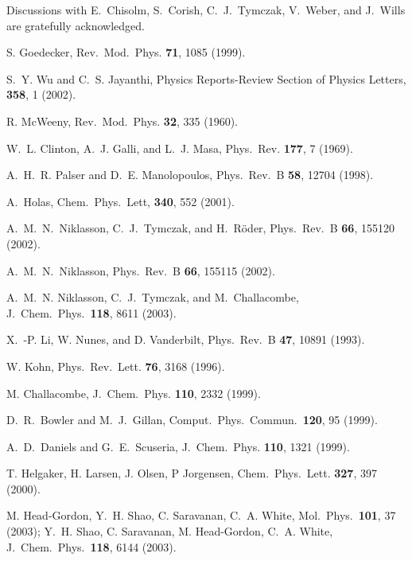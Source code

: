 \documentclass[prl,aps,twocolumn,showpacs,twocolumngrid,superbib]{revtex4}
\begin{document}
Discussions with  E.\ Chisolm, S.\ Corish, C.\ J.\ Tymczak, V.\ Weber, and 
J.\ Wills are gratefully acknowledged.


\begin{references}


 S. Goedecker, Rev.\ Mod.\ Phys. {\bf 71}, 1085 (1999).

 S.\ Y. Wu and C.\ S. Jayanthi, Physics Reports-Review Section of Physics Letters, {\bf 358}, 1 (2002).

 R. McWeeny, Rev.\ Mod.\ Phys. {\bf 32}, 335 (1960).

 W.\ L. Clinton, A.\ J. Galli, and L.\ J. Masa,
Phys.\ Rev. {\bf 177}, 7 (1969).

 A.\ H.\ R. Palser and D.\ E. Manolopoulos,
Phys.\ Rev.\ B {\bf 58}, 12704 (1998).

 A.\ Holas,
Chem.\ Phys.\ Lett, {\bf 340}, 552 (2001).

 A.\ M.\ N.\ Niklasson, C.\ J.\ Tymczak, and H.\ R\"{o}der,
Phys.\ Rev.\ B {\bf 66}, 155120 (2002).

 A.\ M.\ N.\ Niklasson, 
Phys.\ Rev.\ B {\bf 66}, 155115 (2002). 

 A.\ M.\ N. Niklasson, C.\ J.\ Tymczak, and M.\ Challacombe,
J.\ Chem.\ Phys.\ {\bf 118}, 8611 (2003).

 X.\ -P. Li, W. Nunes, and D. Vanderbilt,
Phys.\ Rev.\ B {\bf 47}, 10891 (1993).

 W. Kohn, Phys.\ Rev.\ Lett. {\bf 76}, 3168 (1996).

 M. Challacombe, 
J.\ Chem.\ Phys. {\bf 110}, 2332 (1999).

 D.\ R.\ Bowler and M.\ J.\ Gillan, 
Comput.\ Phys.\ Commun.\ {\bf 120}, 95 (1999).

 A.\ D.\ Daniels and G.\ E.\ Scuseria, 
J.\ Chem.\ Phys. {\bf 110}, 1321 (1999).

 T. Helgaker, H. Larsen, J. Olsen, P Jorgensen,
Chem.\ Phys.\ Lett. {\bf 327}, 397 (2000).

 M. Head-Gordon, Y.\ H.  Shao, C.  Saravanan, C.\ A. White,
Mol.\ Phys.\ {\bf 101}, 37 (2003);
Y.\ H.  Shao, C.  Saravanan, M. Head-Gordon, C.\ A. White,
J.\ Chem.\ Phys.\ {\bf 118}, 6144 (2003).


\end{references}
\end{document}

